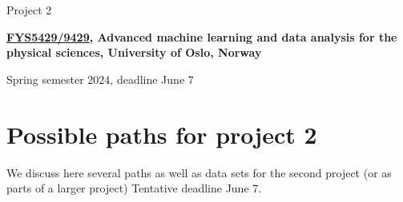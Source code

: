 \documentclass[%
oneside,                 %
final,                   %
10pt]{article}
\begin{document}

\newcommand{\exercisesection}[1]{\subsection*{#1}}






\thispagestyle{empty}

\begin{center}
{\LARGE\bf
\begin{spacing}{1.25}
Project 2
\end{spacing}
}
\end{center}


\begin{center}
{\bf \href{{https://www.uio.no/studier/emner/matnat/fys/FYS5429/index-eng.html}}{FYS5429/9429}, Advanced machine learning and data analysis for the physical sciences, University of Oslo, Norway${}^{}$} \\ [0mm]
\end{center}

\begin{center}
\end{center}
    

\begin{center}
Spring semester 2024, deadline June 7
\end{center}

\vspace{1cm}


\section{Possible paths for project 2}

We discuss here several paths as well as data sets for the second project (or as parts of a larger project)
Tentative deadline June 7.
\end{document}
